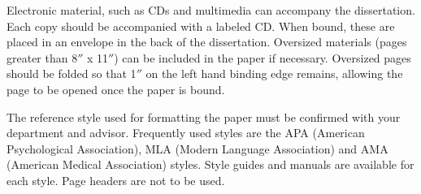 Electronic material, such as CDs and multimedia can accompany the dissertation. Each copy should be accompanied with a labeled CD. When bound, these are placed in an envelope in the back of the dissertation.  Oversized materials (pages greater than 8$''$ x 11$''$) can be included in the paper if necessary. Oversized pages should be folded so that 1$''$ on the left hand binding edge remains, allowing the page to be opened once the paper is bound.

The reference style used for formatting the paper must be confirmed with your department and advisor. Frequently used styles are the APA (American Psychological Association), MLA (Modern Language Association) and AMA (American Medical Association) styles. Style guides and manuals are available for each style. Page headers are not to be used.
